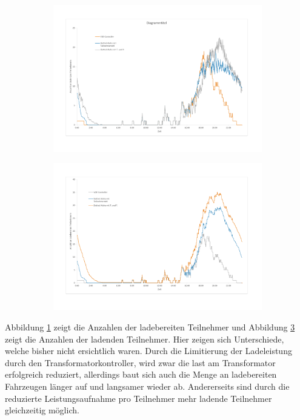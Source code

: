 \begin{figure}
	\begin{subfigure}{\linewidth}
		\includegraphics[scale=0.5]{img/mitTrafo/Teilnehmer1.pdf}
        \label{ABB_mT_Teil1}
	\end{subfigure}
	\begin{subfigure}{\linewidth}
		\includegraphics[scale=0.5]{img/mitTrafo/Teilnehmer3.pdf}
        \label{ABB_mT_teil2}
	\end{subfigure}
\end{figure}
Abbildung \ref{ABB_mT_Teil1} zeigt die Anzahlen der ladebereiten Teilnehmer und Abbildung \ref{ABB_mT_teil2} zeigt die Anzahlen der ladenden Teilnehmer. Hier zeigen sich Unterschiede, welche bisher nicht ersichtlich waren. Durch die Limitierung der Ladeleistung durch den Transformatorkontroller, wird zwar die last am Transformator erfolgreich reduziert, allerdings baut sich auch die Menge an ladebereiten Fahrzeugen länger auf und langsamer wieder ab. Andererseits sind durch die reduzierte Leistungsaufnahme pro Teilnehmer mehr ladende Teilnehmer gleichzeitig möglich.
